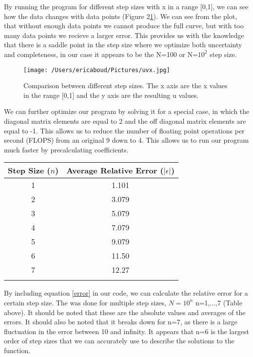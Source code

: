 \documentclass[10pt,showpacs,preprintnumbers,footinbib,amsmath,amssymb,aps,prl,twocolumn,groupedaddress,superscriptaddress,showkeys]{revtex4-1}
\begin{document}
  By running the program for different step sizes with x in a range [0,1], we can see how the data changes with data points (Figure 2\ref{uvx}).    We can see from the plot, that without enough data points we cannot produce the full curve, but with too many data points we recieve a larger error.  This provides us with the knowledge that there is a saddle point in the step size where we optimize both uncertainty and completeness, in our case it appears to be the N=100 or N=$10^{2}$ step size.

\begin{figure}[!ht]
	\centering
	\texttt{[image: /Users/ericaboud/Pictures/uvx.jpg]}
	\label{uvx}
	\caption{Comparison between different step sizes.  The x axis are the x values in the range [0,1] and the y axis are the resulting u values.}
\end{figure}

We can further optimize our program by solving it for a special case, in which the diagonal matrix elements are equal to 2 and the off diagonal matrix elements are equal to -1.  This allows us to reduce the number of floating point operations per second (FLOPS) from an original 9 down to 4.  This allows us to run our program much faster by precalculating coefficients.




\begin{center}
	\begin{tabular}{cc}
		\hline \hline
			Step Size ($n$) &  Average Relative Error ($|\epsilon|$)\\
			\hline
			1 & 1.101\\
			2 & 3.079\\
			3 & 5.079\\
			4 & 7.079\\
			5 & 9.079\\
			6 & 11.50\\
			7 & 12.27\\
			\hline
			\label{errortable}
	\end{tabular}
\end{center}
	
	By including equation \ref{error} in our code, we can calculate the relative error for a certain step size.  The was done for multiple step sizes, $N=10^{n}$ n=1,...,7 (Table above).    It should be noted that these are the absolute values and averages of the errors.  It should also be noted that it breaks down for n=7, as there is a large fluctuation in the error between 10 and infinity.  It appears that n=6 is the largest order of step sizes that we can accurately use to describe the solutions to the function.
	
\end{document}
